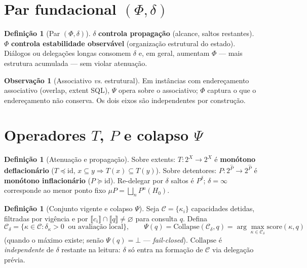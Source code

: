 \documentclass[11pt]{article}
\theoremstyle{definition}
\newtheorem{definition}[theorem]{Definição}
\newtheorem{remark}[theorem]{Observação}
\newcommand{\ext}[1]{\llbracket #1 \rrbracket}
\newcommand{\dep}{\delta}
\newcommand{\CalC}{\mathcal{C}}
\newcommand{\Collapse}{\mathrm{Collapse}}
\newcommand{\Phif}{\Phi}
\begin{document}
\section{Par fundacional $(\Phif,\dep)$}\label{sec:phi-delta}

\begin{definition}[Par $(\Phif,\dep)$]\label{def:phi-delta}
$\dep$ \textbf{controla propagação} (alcance, saltos restantes).
$\Phif$ \textbf{controla estabilidade observável} (organização estrutural
do estado). Diálogos ou delegações longas consomem $\dep$ e, em geral,
aumentam $\Phif$ --- mais estrutura acumulada --- sem violar atenuação.
\end{definition}

\begin{remark}[Associativo \emph{vs.} estrutural]
Em instâncias com endereçamento associativo (overlap, extent SQL), $\Psi$
opera sobre o associativo; $\Phif$ captura o que o endereçamento não
conserva. Os dois eixos são independentes por construção.
\end{remark}

\section{Operadores $T$, $P$ e colapso $\Psi$}\label{sec:TP-collapse}

\begin{definition}[Atenuação e propagação]\label{def:TP}
Sobre extents: $T:2^X\to2^X$ é \textbf{monótono deflacionário}
($T\preceq\mathrm{id}$, $x\subseteq y\Rightarrow T(x)\subseteq T(y)$).
Sobre detentores: $P:2^{\hat P}\to2^{\hat P}$ é \textbf{monótono inflacionário}
($P\succeq\mathrm{id}$). Re-delegar por $\dep$ saltos é $P^{\dep}$;
$\dep=\infty$ corresponde ao menor ponto fixo $\mu P=\bigsqcup_n P^n(H_0)$.
\end{definition}

\begin{definition}[Conjunto vigente e colapso $\Psi$]\label{def:collapse}
Seja $\CalC=\{\kappa_i\}$ capacidades detidas, filtradas por vigência e por
$\ext{c_i}\cap\ext{q}\neq\varnothing$ para consulta $q$. Defina
\[
  \CalC_\dep=\{\kappa\in\CalC:\dep_\kappa>0\ \text{ ou avaliação local}\},
  \qquad
  \Psi(q)=\Collapse(\CalC_\dep,q)
  =\arg\max_{\kappa\in\CalC_\dep}\mathrm{score}(\kappa,q)
\]
(quando o máximo existe; senão $\Psi(q)=\bot$ --- \emph{fail-closed}).
$\Collapse$ é \emph{independente} de $\dep$ restante na leitura: $\dep$ só
entra na formação de $\CalC$ via delegação prévia.
\end{definition}
\end{document}
